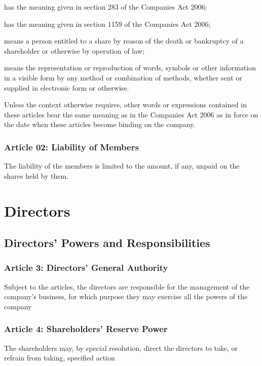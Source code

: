 \documentclass[letterpaper,10pt,openany,oneside,english]{sphinxmanual}
\begin{document}
 has the meaning given in section 283 of the Companies Act 2006;

 has the meaning given in section 1159 of the Companies Act 2006;

 means a person entitled to a share by reason of the death or bankruptcy of a shareholder or otherwise by operation of law;

 means the representation or reproduction of words, symbols or other information in a visible form by any method or combination of methods, whether sent or supplied in electronic form or otherwise.

Unless the context otherwise requires, other words or expressions contained in these articles bear the same meaning as in the Companies Act 2006 as in force on the date when these articles become binding on the company.


\subsection{Article 02: Liability of Members}
\label{\detokenize{introduction:article-02-liability-of-members}}
The liability of the members is limited to the amount, if any, unpaid on the shares held by them.


\chapter{Directors}
\label{\detokenize{directors:directors}}\label{\detokenize{directors::doc}}

\section{Directors’ Powers and Responsibilities}
\label{\detokenize{directors:directors-powers-and-responsibilities}}

\subsection{Article 3: Directors’ General Authority}
\label{\detokenize{directors:article-3-directors-general-authority}}\label{\detokenize{directors:article-3}}
Subject to the articles, the directors are responsible for the management of the company’s business, for which purpose they may exercise all the powers of the company


\subsection{Article 4: Shareholders’ Reserve Power}
\label{\detokenize{directors:article-4-shareholders-reserve-power}}\label{\detokenize{directors:article-4}}
 The shareholders may, by special resolution, direct the directors to take, or refrain from taking, specified action
\end{document}

